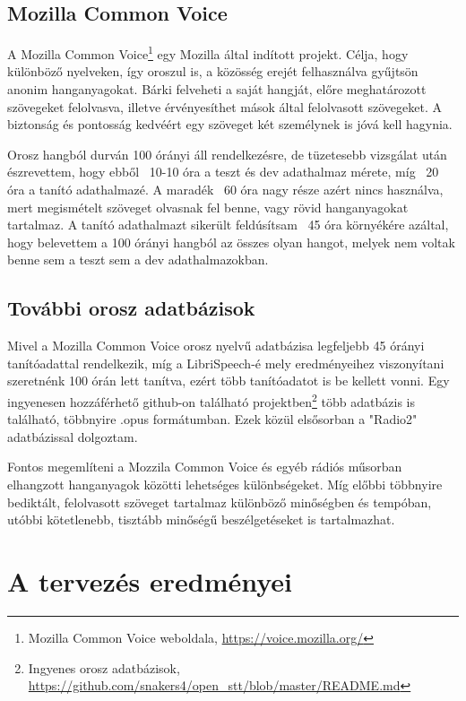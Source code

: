 \subsection{Mozilla Common Voice}

A Mozilla Common Voice\footnote{Mozilla Common Voice weboldala, \url{https://voice.mozilla.org/}} egy Mozilla által indított projekt. Célja, hogy különböző nyelveken, így oroszul is, a közösség erejét felhasználva gyűjtsön anonim hanganyagokat. Bárki felveheti a saját hangját, előre meghatározott szövegeket felolvasva, illetve érvényesíthet mások által felolvasott szövegeket. A biztonság és pontosság kedvéért egy szöveget két személynek is jóvá kell hagynia.

Orosz hangból durván 100 órányi áll rendelkezésre, de tüzetesebb vizsgálat után észrevettem, hogy ebből ~10-10 óra a teszt és dev adathalmaz mérete, míg ~20 óra a tanító adathalmazé. A maradék ~60 óra nagy része azért nincs használva, mert megismételt szöveget olvasnak fel benne, vagy rövid hanganyagokat tartalmaz. A tanító adathalmazt sikerült feldúsítsam ~45 óra környékére azáltal, hogy belevettem a 100 órányi hangból az összes olyan hangot, melyek nem voltak benne sem a teszt sem a dev adathalmazokban.


\subsection{További orosz adatbázisok}

Mivel a Mozilla Common Voice orosz nyelvű adatbázisa legfeljebb 45 órányi tanítóadattal rendelkezik, míg a LibriSpeech-é mely eredményeihez viszonyítani szeretnénk 100 órán lett tanítva, ezért több tanítóadatot is be kellett vonni. Egy ingyenesen hozzáférhető github-on található projektben\footnote{Ingyenes orosz adatbázisok, \url{https://github.com/snakers4/open_stt/blob/master/README.md}} több adatbázis is található, többnyire .opus formátumban. Ezek közül elsősorban a "Radio2" adatbázissal dolgoztam.

Fontos megemlíteni a Mozzila Common Voice és egyéb rádiós műsorban elhangzott hanganyagok közötti lehetséges különbségeket. Míg előbbi többnyire bediktált, felolvasott szöveget tartalmaz különböző minőségben és tempóban, utóbbi kötetlenebb, tisztább minőségű beszélgetéseket is tartalmazhat.

\section{A tervezés eredményei}

